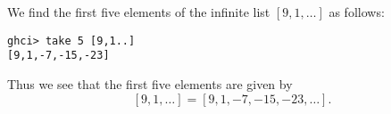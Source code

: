 
We find the first five elements of the infinite list 
$[9, 1, \ldots]$ as follows:
\begin{verbatim}
ghci> take 5 [9,1..]
[9,1,-7,-15,-23]
\end{verbatim}
Thus we see that the first five elements are given by
\[
    [9, 1, \ldots] = [9, 1, -7, -15, -23, \ldots].
\]
